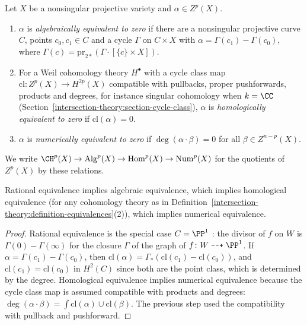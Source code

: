 \begin{definition}\label{intersection-theory:definition-equivalences}
Let $X$ be a nonsingular projective variety and $\alpha \in Z^p(X)$.
\begin{enumerate}
\item $\alpha$ is \emph{algebraically equivalent to zero} if there are a nonsingular projective curve $C$, points $c_0, c_1 \in C$ and a cycle $\Gamma$ on $C \times X$ with
$\alpha = \Gamma(c_1) - \Gamma(c_0)$, where $\Gamma(c) = \mathrm{pr}_{2*}(\Gamma \cdot [\{c\} \times X])$.
\item For a Weil cohomology theory $H^\bullet$ with a cycle class map $\mathrm{cl} \colon Z^p(X) \to H^{2p}(X)$ compatible with pullbacks, proper pushforwards, products and degrees, for instance singular cohomology when $k = \CC$ (Section~\ref{intersection-theory:section-cycle-class}),
$\alpha$ is \emph{homologically equivalent to zero} if $\mathrm{cl}(\alpha) = 0$.
\item $\alpha$ is \emph{numerically equivalent to zero} if $\deg(\alpha \cdot \beta) = 0$ for all $\beta \in Z^{n-p}(X)$.
\end{enumerate}
We write $\CH^p(X) \to \mathrm{Alg}^p(X) \to \mathrm{Hom}^p(X) \to \mathrm{Num}^p(X)$ for the quotients of $Z^p(X)$ by these relations.
\end{definition}

\begin{proposition}\label{intersection-theory:proposition-equivalences}
Rational equivalence implies algebraic equivalence, which implies homological equivalence (for any cohomology theory as in Definition~\ref{intersection-theory:definition-equivalences}(2)), which implies numerical equivalence.
\end{proposition}

\begin{proof}
Rational equivalence is the special case $C = \PP^1$ \cite[Proposition 1.6]{fulton-intersection}: the divisor of $f$ on $W$ is $\Gamma(0) - \Gamma(\infty)$ for the closure $\Gamma$ of the graph
of $f \colon W \dashrightarrow \PP^1$. If $\alpha = \Gamma(c_1) - \Gamma(c_0)$, then $\mathrm{cl}(\alpha) = \Gamma_*(\mathrm{cl}(c_1) - \mathrm{cl}(c_0))$, and
$\mathrm{cl}(c_1) = \mathrm{cl}(c_0)$ in $H^2(C)$ since both are the point class, which is determined by the degree. Homological equivalence implies numerical equivalence because the
cycle class map is assumed compatible with products and degrees: $\deg(\alpha \cdot \beta) = \int\mathrm{cl}(\alpha) \cup \mathrm{cl}(\beta)$. The previous step used the compatibility with pullback and pushforward.
\end{proof}

